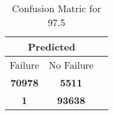 \begin{table}[] 
\caption{Confusion Matric for 97.5} 
\label{Table: Prediction Accuracy-DMD97.5OnlySunEKF-ignoreReflectionEKF-top2-Reflection} 
\centering 
\begin{tabular} 
 {@{}ccc@{}} 
\toprule 
\multicolumn{2}{c}{\textbf{Predicted}}
 \\ \midrule 
\multicolumn{1}{|c|}{Failure} & 
\multicolumn{1}{c|}{No Failure}
 \\ \midrule 
\multicolumn{1}{|c|}{\color{green}\textbf{70978}} & 
\multicolumn{1}{c|}{\color{red}\textbf{5511}}
 \\ \midrule 
\multicolumn{1}{|c|}{\color{red}\textbf{1}} & 
\multicolumn{1}{c|}{\color{green}\textbf{93638}}
 \\ \bottomrule 
\end{tabular} 
\end{table} 
